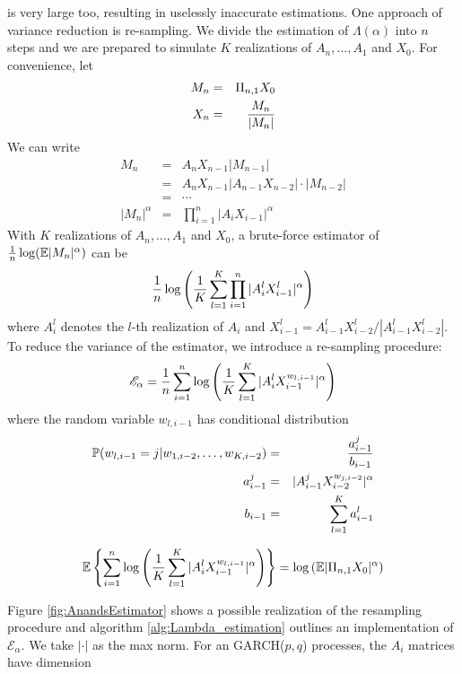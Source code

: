 \documentclass[aoas,preprint]{imsart}
\numberwithin{equation}{section}
\theoremstyle{plain}
\begin{document}
is very large too, resulting in uselessly inaccurate estimations. One
approach of variance reduction is re-sampling. We divide the
estimation of $\Lambda(\alpha)$ into $n$ steps and we are prepared to
simulate $K$ realizations of $A_n, \dots, A_1$ and $X_0$. For
convenience, let
\begin{eqnarray*}
  M_n &=& \Pi_{n, 1} X_0 \\
  X_n &=& {M_n \over |M_n|}
\end{eqnarray*}
We can write
\begin{eqnarray*}
  M_n &=& A_n X_{n - 1} |M_{n - 1}| \\
  &=& A_n X_{n - 1} |A_{n-1} X_{n-2}| \cdot |M_{n-2}| \\
  &=& \cdots \\
  |M_n|^\alpha &=& \prod_{i=1}^n |A_i X_{i-1}|^\alpha
\end{eqnarray*}
With $K$ realizations of $A_n, \dots, A_1$ and $X_0$, a brute-force
estimator of ${1 \over n} \log(\E |M_n|^\alpha)$ can be
\[
{1 \over n} \log \left(
  {1 \over K} \sum_{l=1}^K \prod_{i=1}^n |A_i^l X^l_{i-1}|^\alpha
\right)
\]
where $A_i^l$ denotes the $l$-th realization of $A_i$ and
$X^l_{i-1} = A_{i-1}^l X^l_{i-2}/|A_{i-1}^l X^l_{i-2}|$. To reduce the
variance of the estimator, we introduce a re-sampling procedure:
\begin{equation}
  \label{eq:AnandsEstimator}
  \mathscr E_\alpha =
  {1 \over n}
  \sum_{i=1}^n \log \left(
    {1 \over K}\sum_{l=1}^K |A_i^l X^{w_{l, i-1}}_{i-1}|^\alpha
  \right)
\end{equation}
where the random variable $w_{l, i-1}$ has conditional distribution
\begin{eqnarray*}
  \P(w_{l, i-1} = j | w_{1, i-2}, \dots, w_{K, i-2}) &=& {a^j_{i-1} \over b_{i-1}} \\
  a_{i-1}^j &=& |A_{i-1}^j X_{i-2}^{w_{j, i-2}}|^\alpha \\
  b_{i-1} &=& \sum_{l=1}^K a_{i-1}^l
\end{eqnarray*}
\begin{theorem}
  \[
  \E \left\{
    \sum_{i=1}^n \log \left(
      {1 \over K}\sum_{l=1}^K |A_i^l X^{w_{l, i-1}}_{i-1}|^\alpha
    \right)
  \right\} = \log \left(
    \E |\Pi_{n, 1} X_0|^\alpha
  \right)
  \]
\end{theorem}
Figure \ref{fig:AnandsEstimator} shows a possible realization of the
resampling procedure and algorithm \ref{alg:Lambda_estimation}
outlines an implementation of $\mathscr E_\alpha$. We take
$|\cdot|$ as the max norm.
For an GARCH($p, q$) processes, the $A_i$ matrices have dimension
\end{document}
